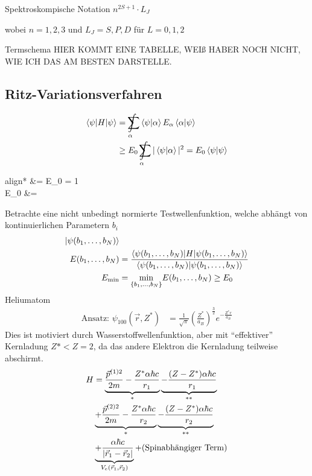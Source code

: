 Spektroskompische Notation $n^{2 S + 1} \cdot L_J$

wobei $n=1,2,3$ und $L_J = S, P, D$ für $L=0, 1, 2$

Termschema
HIER KOMMT EINE TABELLE, WEIß HABER NOCH NICHT, WIE ICH DAS AM BESTEN DARSTELLE. 

\subsection{Ritz-Variationsverfahren}
	\begin{align*}	
	\braket{\psi | H | \psi} &= \int \limits_\alpha\!\!\!\!\!\!\!\!\!\;\sum
	\braket{\psi | \alpha} E_\alpha \braket{\alpha | \psi} \\
	&\geq E_0 \int \limits_\alpha\!\!\!\!\!\!\!\!\!\;\sum |\braket{\psi | \alpha}|^2 
	= E_0 \braket{\psi | \psi}
	\end{align*}
	\begin{empheq}[box=\boxed]{align*}
		\Rightarrow {} &= E_0  \braket{\psi | \psi} = 1 \\
		 E_0 &=  
	\end{empheq}
Betrachte eine nicht unbedingt normierte Testwellenfunktion, welche abhängt von kontinuierlichen Parametern $b_i$
	\begin{align*}
		\ket{\psi (b_1, \ldots, b_N)}& \\
		E(b_1, \ldots, b_N) &= 
		\frac{\braket{\psi (b_1, \ldots, b_N)|H|\psi (b_1, \ldots, b_N)}}{\braket{\psi (b_1, \ldots, b_N)|\psi (b_1, \ldots, b_N)}} \\
		E_{\text{min}} &= \underset{\{b_1, \ldots, b_N\}}{\mathrm{min}}
		E(b_1, \ldots, b_N) \geq E_0
	\end{align*}
Heliumatom
	\begin{align*}
		\text{Ansatz: } \psi_{100}(\vec{r}, Z^*)
		&= \frac{1}{\sqrt{\pi}} \left(\frac{Z^*}{a_B}\right)^{\frac{3}{2}} e^{-\frac{Z^* r}{a_B}}
	\end{align*}
Dies ist motiviert durch Wasserstoffwellenfunktion, aber mit ``effektiver'' Kernladung 
$Z* < Z = 2$, da das andere Elektron die Kernladung teilweise abschirmt.
	\begin{align*}
		H &= \underbrace{\frac{\vec{p}^{(1)2}}{2m} - \frac{Z^* \alpha \hbar c}{r_1}}_{\mathclap{*}}
		\underbrace{- \frac{(Z-Z^*)\alpha \hbar c}{r_1}}_{\mathclap{**}} \\
		&\underbrace{+ \frac{\vec{p}^{(2)2}}{2m} - \frac{Z^* \alpha \hbar c}{r_2}}_{\mathclap{*}}
		\underbrace{- \frac{(Z-Z^*)\alpha \hbar c}{r_2}}_{\mathclap{**}} \\
		&\underbrace{+ \frac{\alpha \hbar c}{|\vec{r}_1 - \vec{r}_2|}}_{\mathclap{V_e(\vec{r}_1, \vec{r}_2)}} + (\text{Spinabhängiger Term})
	\end{align*}
